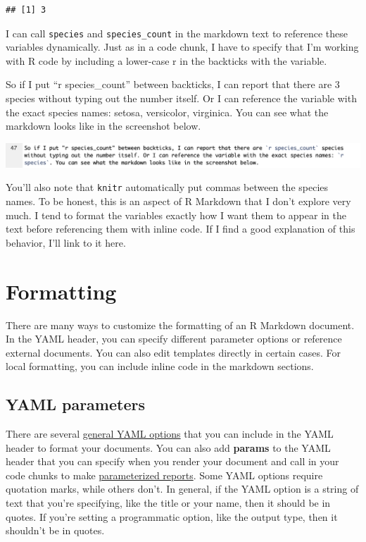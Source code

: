 \documentclass[
]{book}
\begin{document}
\begin{verbatim}
## [1] 3
\end{verbatim}

I can call \texttt{species} and \texttt{species\_count} in the markdown text to reference these variables dynamically. Just as in a code chunk, I have to specify that I'm working with R code by including a lower-case r in the backticks with the variable.

So if I put ``r species\_count'' between backticks, I can report that there are 3 species without typing out the number itself. Or I can reference the variable with the exact species names: setosa, versicolor, virginica. You can see what the markdown looks like in the screenshot below.

\includegraphics[width=22.67in]{images/content_intext_iris}

You'll also note that \texttt{knitr} automatically put commas between the species names. To be honest, this is an aspect of R Markdown that I don't explore very much. I tend to format the variables exactly how I want them to appear in the text before referencing them with inline code. If I find a good explanation of this behavior, I'll link to it here.

\hypertarget{format}{%
\chapter{Formatting}\label{format}}

There are many ways to customize the formatting of an R Markdown document. In the YAML header, you can specify different parameter options or reference external documents. You can also edit templates directly in certain cases. For local formatting, you can include inline code in the markdown sections.

\hypertarget{yaml-parameters}{%
\section{YAML parameters}\label{yaml-parameters}}

There are several \href{https://ymlthis.r-lib.org/articles/yaml-fieldguide.html}{general YAML options} that you can include in the YAML header to format your documents. You can also add \textbf{params} to the YAML header that you can specify when you render your document and call in your code chunks to make \href{https://rmarkdown.rstudio.com/developer_parameterized_reports.html\%23parameter_types\%2F}{parameterized reports}. Some YAML options require quotation marks, while others don't. In general, if the YAML option is a string of text that you're specifying, like the title or your name, then it should be in quotes. If you're setting a programmatic option, like the output type, then it shouldn't be in quotes.
\end{document}
